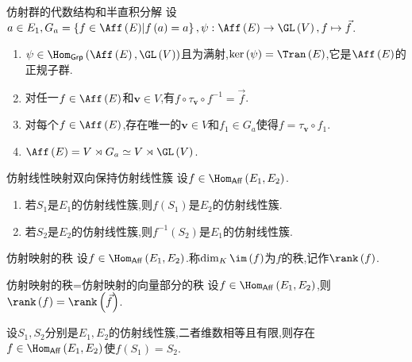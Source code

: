 \begin{proposition}{仿射群的代数结构和半直积分解}{}
	设$a\in E_{1},G_{a}=\left\{f\in\Aff\left(E\right)\middle|f\left(a\right)=a\right\},\psi:\Aff\left(E\right)\to\GL\left(V\right),f\mapsto\vec{f}$.
	\begin{enumerate}
		\item $\psi\in\Hom_{\mathsf{Grp}}\left(\Aff\left(E\right),\GL\left(V\right)\right)$且为满射,$\ker\left(\psi\right)=\Tran\left(E\right)$,它是$\Aff\left(E\right)$的正规子群.
		\item 对任一$f\in\Aff\left(E\right)$和$\mathbf{v}\in V$,有$f\circ\tau_{\mathbf{v}}\circ f^{-1}=\vec{f}$.
		\item 对每个$f\in\Aff\left(E\right)$,存在唯一的$\mathbf{v}\in V$和$f_{1}\in G_{a}$使得$f=\tau_{\mathbf{v}}\circ f_{1}$.
		\item $\Aff\left(E\right)=V\rtimes G_{a}\simeq V\rtimes\GL\left(V\right)$.
	\end{enumerate}
\end{proposition}

\begin{proposition}{仿射线性映射双向保持仿射线性簇}{}
	设$f\in\Hom_{\mathsf{Aff}}\left(E_{1},E_{2}\right)$.
	\begin{enumerate}
		\item 若$S_{1}$是$E_{1}$的仿射线性簇,则$f\left(S_{1}\right)$是$E_{2}$的仿射线性簇.
		\item 若$S_{2}$是$E_{2}$的仿射线性簇,则$f^{-1}\left(S_{2}\right)$是$E_{1}$的仿射线性簇.
	\end{enumerate}
\end{proposition}

\begin{definition}{仿射映射的秩}{}
	设$f\in\Hom_{\mathsf{Aff}}\left(E_{1},E_{2}\right)$.称$\dim_{K}\im\left(f\right)$为$f$的秩,记作$\rank\left(f\right)$.
\end{definition}

\begin{proposition}{仿射映射的秩=仿射映射的向量部分的秩}{}
	设$f\in\Hom_{\mathsf{Aff}}\left(E_{1},E_{2}\right)$,则$\rank\left(f\right)=\rank\left(\vec{f}\right)$.
\end{proposition}

\begin{proposition}{}{}
	设$S_{1},S_{2}$分别是$E_{1},E_{2}$的仿射线性簇,二者维数相等且有限,则存在$f\in\Hom_{\mathsf{Aff}}\left(E_{1},E_{2}\right)$使$f\left(S_{1}\right)=S_{2}$.
\end{proposition}

